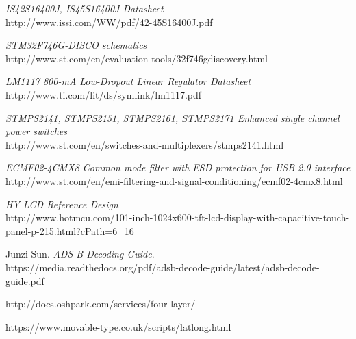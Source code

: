 \documentclass[eng,printmode]{mgr}
\begin{document}
\begin{thebibliography}{9}
\textit{IS42S16400J, IS45S16400J Datasheet} \\
http://www.issi.com/WW/pdf/42-45S16400J.pdf

\textit{STM32F746G-DISCO schematics}\\
http://www.st.com/en/evaluation-tools/32f746gdiscovery.html

\textit{LM1117 800-mA Low-Dropout Linear Regulator Datasheet}\\
http://www.ti.com/lit/ds/symlink/lm1117.pdf

\textit{STMPS2141, STMPS2151, STMPS2161,
STMPS2171 Enhanced single channel power switches}\\
http://www.st.com/en/switches-and-multiplexers/stmps2141.html

\textit{ECMF02-4CMX8
Common mode filter with ESD protection for USB 2.0 interface}\\
http://www.st.com/en/emi-filtering-and-signal-conditioning/ecmf02-4cmx8.html

\textit{HY LCD Reference Design}\\
http://www.hotmcu.com/101-inch-1024x600-tft-lcd-display-with-capacitive-touch-panel-p-215.html?cPath=6_16


Junzi Sun. 
\textit{ADS-B Decoding Guide}.\\
https://media.readthedocs.org/pdf/adsb-decode-guide/latest/adsb-decode-guide.pdf

http://docs.oshpark.com/services/four-layer/

https://www.movable-type.co.uk/scripts/latlong.html

\end{thebibliography}
\end{document}
